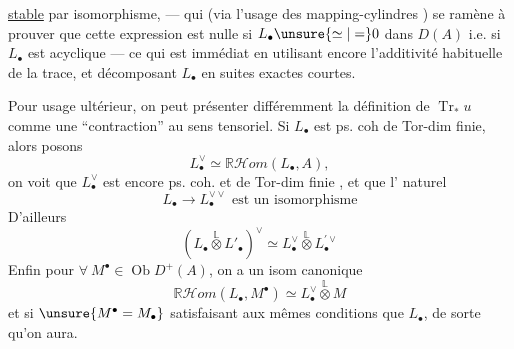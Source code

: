 \uline{stable} par isomorphisme, --- qui  (via l'usage des mapping-cylindres ) se ramène à prouver que cette expression est nulle si $L_\bullet\unsure{\simeq|=}0$ dans $D(A)$ i.e. si $L_\bullet$ est acyclique --- ce qui est immédiat en utilisant encore l'additivité habituelle de la trace, et décomposant $L_\bullet$ en suites exactes courtes.

Pour usage ultérieur, on peut présenter différemment la définition de $\operatorname{Tr}_*u$ comme une ``contraction'' au sens tensoriel. Si $L_\bullet$ est ps. coh de Tor-dim finie, alors posons
\[
L_\bullet^\vee\simeq\mathbb R\mathcal Hom(L_\bullet,A),
\]
on voit que $L_\bullet^\vee$ est encore ps. coh. et de Tor-dim finie , et que l'  naturel
\[
\boxed{L_\bullet\longrightarrow L_\bullet^{\vee\vee}\text{ est un isomorphisme}}
\]
D'ailleurs
\[
\boxed{(L_\bullet\overset{\mathbb L}{\otimes}L'_\bullet)^\vee\simeq L_\bullet^\vee\overset{\mathbb L}{\otimes}L_\bullet^{\prime\vee}}
\]
Enfin pour $\forall\ M^\bullet\in\operatorname{Ob}D^+(A)$, on a un isom canonique
\[
\boxed{\mathbb R\mathcal Hom(L_\bullet,M^\bullet)\simeq L_\bullet^\vee\overset{\mathbb L}{\otimes}M}
\]
et si $\unsure{M^\bullet=M_\bullet}$ satisfaisant aux mêmes conditions que $L_\bullet$, de sorte qu'on aura.
